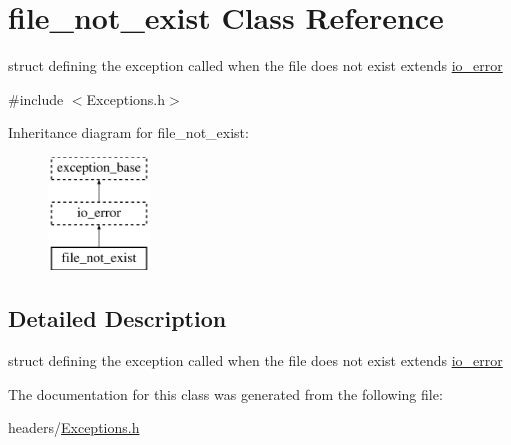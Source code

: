 \hypertarget{structfile__not__exist}{\section{file\-\_\-not\-\_\-exist \-Class \-Reference}
\label{structfile__not__exist}
}


struct defining the exception called when the file does not exist extends \hyperlink{structio__error}{io\-\_\-error}  




{\ttfamily \#include $<$\-Exceptions.\-h$>$}

\-Inheritance diagram for file\-\_\-not\-\_\-exist\-:\begin{figure}[H]
\begin{center}
\leavevmode
\includegraphics[height=3.000000cm]{structfile__not__exist}
\end{center}
\end{figure}


\subsection{\-Detailed \-Description}
struct defining the exception called when the file does not exist extends \hyperlink{structio__error}{io\-\_\-error} 

\-The documentation for this class was generated from the following file\-:\begin{DoxyCompactItemize}
\item 
headers/\hyperlink{_exceptions_8h}{\-Exceptions.\-h}\end{DoxyCompactItemize}
